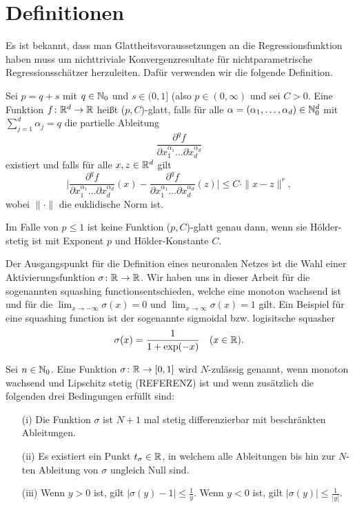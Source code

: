 \section{Definitionen}
Es ist bekannt, dass man Glattheitsvoraussetzungen an die Regressionsfunktion haben muss um nichttriviale Konvergenzresultate für nichtparametrische Regressionsschätzer herzuleiten. Dafür verwenden wir die folgende Definition.
\begin{defn}[($p,C$)-Glattheit]
\label{def:pc}
   Sei $p = q + s$ mit $q \in \mathbb{N}_0$ und $s \in (0,1]$ (also $p \in (0, \infty)$ und sei $C > 0$. Eine Funktion $f\colon \mathbb{R}^d \to \mathbb{R}$ heißt ($p, C$)-glatt, falls für alle $\alpha = (\alpha_1,\dots,\alpha_d) \in \mathbb{N}_0^d$ mit $\sum_{j = 1}^{d}\alpha_j = q$ die partielle Ableitung 
   $$ \frac{\partial^qf}{\partial x_1^{\alpha_1}\dots\partial x_d^{\alpha_d}}$$
   existiert und falls für alle $x, z \in \mathbb{R}^d$ gilt
   $$ \bigg|\frac{\partial^qf}{\partial x_1^{\alpha_1}\dots\partial x_d^{\alpha_d}}(x) - \frac{\partial^qf}{\partial x_1^{\alpha_1}\dots\partial x_d^{\alpha_d}}(z) \bigg| \leq C \cdot \|x - z\|^r,$$
   wobei $\|\cdot\|$ die euklidische Norm ist.  
\end{defn}
\begin{bemnumber}
Im Falle von $p \leq 1$ ist keine Funktion ($p, C$)-glatt genau dann, wenn sie Hölder-stetig ist mit Exponent $p$ und Hölder-Konstante $C$.
\end{bemnumber}

Der Ausgangspunkt für die Definition eines neuronalen Netzes ist die Wahl einer Aktivierungsfunktion $\sigma\colon \mathbb{R} \to \mathbb{R}$. Wir haben uns in dieser Arbeit für die sogenannten \glqq squashing functions\grqq entschieden, welche eine monoton wachsend ist und für die $\lim_{x \to -\infty}\sigma(x) = 0$ und $\lim_{x \to \infty}\sigma(x) = 1$ gilt. Ein Beispiel für eine squashing function ist der sogenannte sigmoidal bzw. logisitsche squasher
\begin{align}
\label{logsquasher}
\sigma(x) = \frac{1}{1 + \exp(-x)} \quad (x \in \mathbb{R}).
\end{align}

\begin{defn}
\label{nzulässig}
Sei $n \in \mathbb{N}_0$. Eine Funktion $\sigma\colon \mathbb{R} \to [0, 1]$ wird $N$-zulässig genannt, wenn monoton wachsend und Lipschitz stetig (REFERENZ) ist und wenn zusätzlich die folgenden drei Bedingungen erfüllt sind$\colon$
\begin{itemize}
\item[(i)] Die Funktion $\sigma$ ist $N + 1$ mal stetig differenzierbar mit beschränkten Ableitungen.
\item[(ii)] Es existiert ein Punkt $t_{\sigma} \in \mathbb{R}$, in welchem alle Ableitungen bis hin zur $N$-ten Ableitung von $\sigma$ ungleich Null sind.
\item[(iii)] Wenn $y > 0$ ist, gilt $|\sigma(y) - 1| \leq \frac{1}{y}$. Wenn $y < 0$ ist, gilt $|\sigma(y)| \leq \frac{1}{|y|}$.
\end{itemize}  
\end{defn}  

